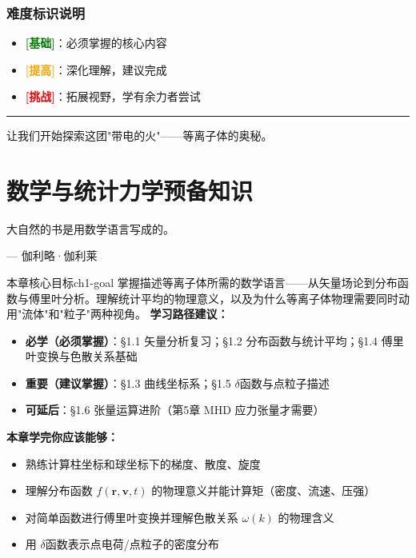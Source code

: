 \documentclass[12pt,a4paper,openany,oneside]{book}
\newcommand{\vect}[1]{\bm{#1}}
\begin{document}
\subsection*{难度标识说明}
\begin{itemize}
\item \textcolor{green}{\textbf{[基础]}}：必须掌握的核心内容
\item \textcolor{orange}{\textbf{[提高]}}：深化理解，建议完成
\item \textcolor{red}{\textbf{[挑战]}}：拓展视野，学有余力者尝试
\end{itemize}

\vspace{1em}
\noindent\rule{\textwidth}{0.4pt}
\vspace{1em}
让我们开始探索这团"带电的火"——等离子体的奥秘。

\chapter{数学与统计力学预备知识}
\epigraph{大自然的书是用数学语言写成的。}{--- 伽利略·伽利莱}

\begin{insight}{本章核心目标}{ch1-goal}
掌握描述等离子体所需的数学语言——从矢量场论到分布函数与傅里叶分析。理解统计平均的物理意义，以及为什么等离子体物理需要同时动用"流体"和"粒子"两种视角。
\tcblower
\textbf{学习路径建议：}

\begin{itemize}[leftmargin=*]
\item[\textcolor{red}{$\blacksquare$}] \textbf{必学（必须掌握）}：\S1.1 矢量分析复习；\S1.2 分布函数与统计平均；\S1.4 傅里叶变换与色散关系基础
\item[\textcolor{orange}{$\blacksquare$}] \textbf{重要（建议掌握）}：\S1.3 曲线坐标系；\S1.5 $\delta$函数与点粒子描述
\item[\textcolor{green}{$\blacksquare$}] \textbf{可延后}：\S1.6 张量运算进阶（第5章 MHD 应力张量才需要）
\end{itemize}

\textbf{本章学完你应该能够：}
\begin{itemize}[label=$\square$]
\item 熟练计算柱坐标和球坐标下的梯度、散度、旋度
\item 理解分布函数 $f(\vect{r},\vect{v},t)$ 的物理意义并能计算矩（密度、流速、压强）
\item 对简单函数进行傅里叶变换并理解色散关系 $\omega(k)$ 的物理含义
\item 用 $\delta$函数表示点电荷/点粒子的密度分布
\end{itemize}
\end{insight}
\end{document}
